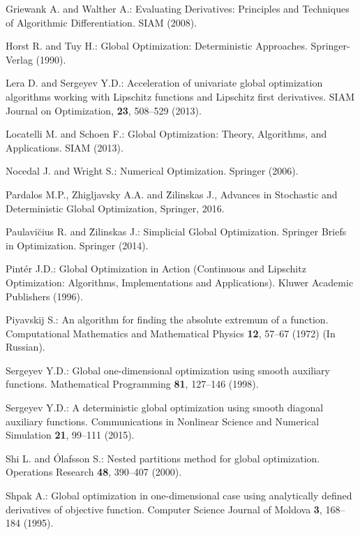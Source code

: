 \documentclass[runningheads]{llncs}
\begin{document}
\begin{thebibliography}{8}
Griewank A. and Walther A.: Evaluating Derivatives: Principles and Techniques of Algorithmic Differentiation. SIAM (2008).

Horst R. and Tuy H.: Global Optimization: Deterministic Approaches. Springer-Verlag (1990).

Lera D. and Sergeyev Y.D.: Acceleration of univariate global optimization algorithms working with Lipschitz functions and Lipschitz first derivatives. SIAM Journal on Optimization, \textbf{23}, 508--529 (2013).

Locatelli M. and Schoen F.: Global Optimization: Theory, Algorithms, and Applications. SIAM (2013).

Nocedal J. and Wright S.: Numerical Optimization. Springer (2006).

Pardalos M.P., Zhigljavsky A.A. and \u{Z}ilinskas J., Advances in Stochastic and Deterministic
Global Optimization, Springer, 2016.

Paulavi\u{c}ius R. and \u{Z}ilinskas J.: Simplicial Global Optimization. Springer Briefs in Optimization. Springer (2014).

Pint\'{e}r J.D.: Global Optimization in Action (Continuous and Lipschitz Optimization: Algorithms, Implementations and Applications). Kluwer Academic Publishers (1996).

Piyavskij S.: An algorithm for finding the absolute extremum of a function. Computational Mathematics and Mathematical Physics \textbf{12}, 57--67 (1972) (In Russian).

Sergeyev Y.D.: Global one-dimensional optimization using smooth auxiliary functions. Mathematical Programming \textbf{81}, 127--146 (1998).

Sergeyev Y.D.: A deterministic global optimization using smooth diagonal auxiliary functions. Communications in Nonlinear Science and Numerical Simulation \textbf{21}, 99--111 (2015).

Shi L. and \'{O}lafsson S.: Nested partitions method for global optimization. Operations Research \textbf{48}, 390--407 (2000).
	
Shpak A.: Global optimization in one-dimensional case using analytically defined derivatives of objective function. Computer Science Journal of Moldova \textbf{3}, 168--184 (1995).


\end{thebibliography}
\end{document}
